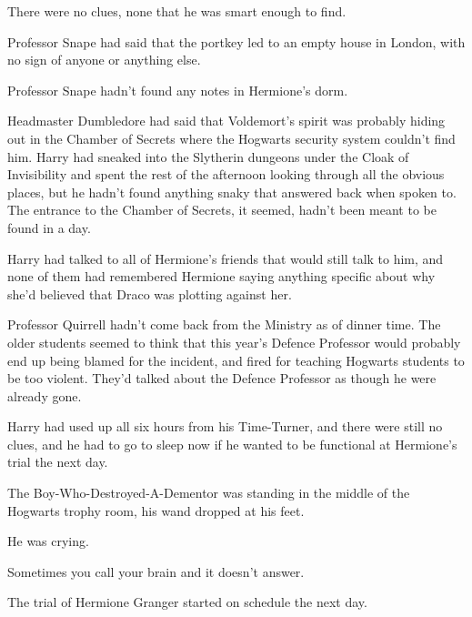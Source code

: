 There were no clues, none that he was smart enough to find.

Professor Snape had said that the portkey led to an empty house in London, with no sign of anyone or anything else.

Professor Snape hadn’t found any notes in Hermione’s dorm.

Headmaster Dumbledore had said that Voldemort’s spirit was probably hiding out in the Chamber of Secrets where the Hogwarts security system couldn’t find him. Harry had sneaked into the Slytherin dungeons under the Cloak of Invisibility and spent the rest of the afternoon looking through all the obvious places, but he hadn’t found anything snaky that answered back when spoken to. The entrance to the Chamber of Secrets, it seemed, hadn’t been meant to be found in a day.

Harry had talked to all of Hermione’s friends that would still talk to him, and none of them had remembered Hermione saying anything specific about why she’d believed that Draco was plotting against her.

Professor Quirrell hadn’t come back from the Ministry as of dinner time. The older students seemed to think that this year’s Defence Professor would probably end up being blamed for the incident, and fired for teaching Hogwarts students to be too violent. They’d talked about the Defence Professor as though he were already gone.

Harry had used up all six hours from his Time-Turner, and there were still no clues, and he had to go to sleep now if he wanted to be functional at Hermione’s trial the next day.

The Boy-Who-Destroyed-A-Dementor was standing in the middle of the Hogwarts trophy room, his wand dropped at his feet.

He was crying.

Sometimes you call your brain and it doesn’t answer.

The trial of Hermione Granger started on schedule the next day.

